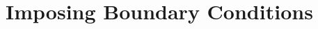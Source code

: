 \documentclass[../fem.tex]{subfile}
\begin{document}
\section{Imposing Boundary Conditions}%
\label{sec:imposing_boundary_conditions}
\end{document}
